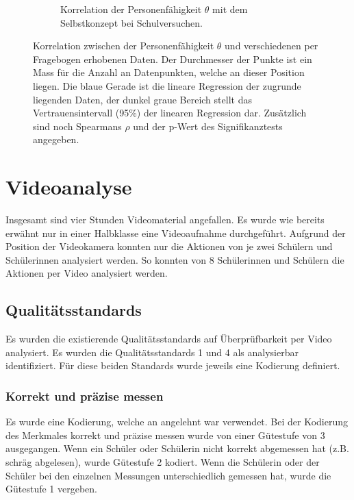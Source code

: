 \begin{figure}[htbp]
\begin{subfigure}{0.49\textwidth}
    \caption{Korrelation der Personenfähigkeit $\theta$ mit dem Selbstkonzept bei Schulversuchen.}
    \label{fig:corPersonenSelbskonzept}
  \end{subfigure}
 \caption{Korrelation zwischen der Personenfähigkeit $\theta$ und verschiedenen per Fragebogen erhobenen Daten. Der Durchmesser der Punkte ist ein Mass für die Anzahl an Datenpunkten, welche an dieser Position liegen. Die blaue Gerade ist die lineare Regression der zugrunde liegenden Daten, der dunkel graue Bereich stellt das Vertrauensintervall (95\%) der linearen Regression dar. Zusätzlich sind noch Spearmans $\rho$ und der p-Wert des Signifikanztests angegeben.}
 \label{fig:corPersonen}
 \end{figure}
 
 \clearpage
 \section{Videoanalyse}
 
 Insgesamt sind vier Stunden Videomaterial angefallen. Es wurde wie bereits erwähnt nur in einer Halbklasse eine Videoaufnahme durchgeführt. Aufgrund der Position der Videokamera konnten nur die Aktionen von je zwei Schülern und Schülerinnen analysiert werden. So konnten von 8 Schülerinnen und Schülern die Aktionen per Video analysiert werden.
 
 \subsection{Qualitätsstandards}
 
 Es wurden die existierende Qualitätsstandards auf Überprüfbarkeit per Video analysiert. Es wurden die Qualitätsstandards 1 und 4 als analysierbar identifiziert. Für diese beiden Standards wurde jeweils eine Kodierung definiert.
 
 \subsubsection{Korrekt und präzise messen}
 
 Es wurde eine Kodierung, welche an \citet{Schreiber2012} angelehnt war verwendet. Bei der Kodierung des Merkmales korrekt und präzise messen wurde von einer Gütestufe von 3 ausgegangen. Wenn ein Schüler oder Schülerin nicht korrekt abgemessen hat (z.B. schräg abgelesen), wurde Gütestufe 2 kodiert. Wenn die Schülerin oder der Schüler bei den einzelnen Messungen unterschiedlich gemessen hat, wurde die Gütestufe 1 vergeben.
 
